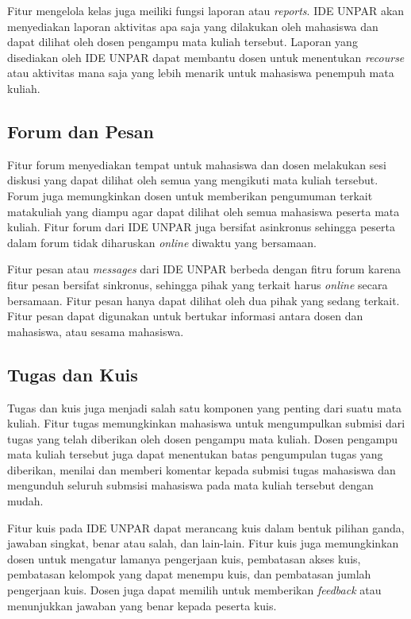 Fitur mengelola kelas juga meiliki fungsi laporan atau \textit{reports}. IDE UNPAR akan menyediakan laporan aktivitas apa saja yang dilakukan oleh mahasiswa dan dapat dilihat oleh dosen pengampu mata kuliah tersebut. Laporan yang disediakan oleh IDE UNPAR dapat membantu dosen untuk menentukan \textit{recourse} atau aktivitas mana saja yang lebih menarik untuk mahasiswa penempuh mata kuliah.

\subsection{Forum dan Pesan}
Fitur forum menyediakan tempat untuk mahasiswa dan dosen melakukan sesi diskusi yang dapat dilihat oleh semua yang mengikuti mata kuliah tersebut. Forum juga memungkinkan dosen untuk memberikan pengumuman terkait matakuliah yang diampu agar dapat dilihat oleh semua mahasiswa peserta mata kuliah. Fitur forum dari IDE UNPAR juga bersifat asinkronus sehingga peserta dalam forum tidak diharuskan \textit{online} diwaktu yang bersamaan.

Fitur pesan atau \textit{messages} dari IDE UNPAR berbeda dengan fitru forum karena fitur pesan bersifat sinkronus, sehingga pihak yang terkait harus \textit{online} secara bersamaan. Fitur pesan hanya dapat dilihat oleh dua pihak yang sedang terkait. Fitur pesan dapat digunakan untuk bertukar informasi antara dosen dan mahasiswa, atau sesama mahasiswa.

\subsection{Tugas dan Kuis}
Tugas dan kuis juga menjadi salah satu komponen yang penting dari suatu mata kuliah. Fitur tugas memungkinkan mahasiswa untuk mengumpulkan submisi dari tugas yang telah diberikan oleh dosen pengampu mata kuliah. Dosen pengampu mata kuliah tersebut juga dapat menentukan batas pengumpulan tugas yang diberikan, menilai dan memberi komentar kepada submisi tugas mahasiswa dan mengunduh seluruh submsisi mahasiswa pada mata kuliah tersebut dengan mudah.

Fitur kuis pada IDE UNPAR dapat merancang kuis dalam bentuk pilihan ganda, jawaban singkat, benar atau salah, dan lain-lain\cite{IDE:dasar-dasar}. Fitur kuis juga memungkinkan dosen untuk mengatur lamanya pengerjaan kuis, pembatasan akses kuis, pembatasan kelompok yang dapat menempu kuis, dan pembatasan jumlah pengerjaan kuis.  Dosen juga dapat memilih untuk memberikan \textit{feedback} atau menunjukkan jawaban yang benar kepada peserta kuis.
